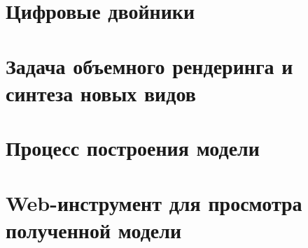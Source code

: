 \documentclass[14pt,a4paper]{extarticle}
\begin{document}
\hypersetup{pageanchor=false}


\clearpage


\clearpage

\hypersetup{pageanchor=true}
\setcounter{page}{2}
\tableofcontents
\clearpage


\clearpage

\section{Цифровые двойники}

\clearpage

\section{Задача объемного рендеринга и синтеза новых видов}








\clearpage

\section{Процесс построения модели}





\clearpage

\section{Web-инструмент для просмотра полученной модели}



\clearpage


\clearpage

{}
\printbibliography[title={Список литературы}]

\newpage

\end{document}
